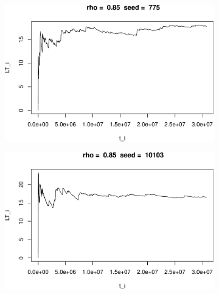 \documentclass[]{article}
\begin{document}
\begin{figure}[h!]
\begin{subfigure}[b]{.55\linewidth}

\includegraphics[width=\linewidth]{003_files/figure-latex/unnamed-chunk-20-1.pdf}
\end{subfigure}\hfill
\begin{subfigure}[b]{.55\linewidth}
\includegraphics[width=\linewidth]{003_files/figure-latex/unnamed-chunk-20-2.pdf}
\end{subfigure}\vfill
\end{figure}
\end{document}
